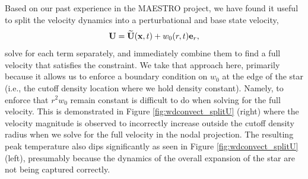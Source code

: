 \documentclass{aastex62}
\newcommand{\eb}{{\bf{e}}}
\newcommand{\Ub}{{\bf{U}}}
\newcommand{\Ubt}{\widetilde{\Ub}}
\newcommand{\xb}{{\bf{x}}}
\begin{document}
Based on our past experience in the MAESTRO project, we have found it useful to split the velocity dynamics into a perturbational and base state velocity,
\begin{equation}
\Ub = \Ubt(\xb,t) + w_0(r,t)\eb_r,
\end{equation}
solve for each term separately, and immediately combine them to find a full velocity that satisfies the constraint.  We take that approach here, primarily because it allows us to enforce a boundary condition on $w_0$ at the edge of the star (i.e., the cutoff density location where we hold density constant).  Namely, to enforce that $r^2 w_0$ remain constant is difficult to do when solving for the full velocity. 
This is demonstrated in Figure \ref{fig:wdconvect_splitU} (right) where the velocity magnitude is observed to incorrectly increase outside the cutoff density radius when we solve for the full velocity in the nodal projection.
The resulting peak temperature also dips significantly as seen in Figure \ref{fig:wdconvect_splitU} (left), presumably because the dynamics of the overall expansion of the star are not being captured correctly.
\end{document}
